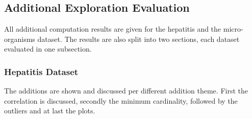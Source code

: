 \documentclass[10pt,a4paper]{report}
\begin{document}
	\subsection{Additional Exploration Evaluation}
	\label{DEsubsec:ResultsAdditionalEvaluation}
	
	All additional computation results are given for the hepatitis and the micro-organisms dataset. The results are also split into two sections, each dataset evaluated in one subsection.
	
	\subsubsection{Hepatitis Dataset}
	\label{DEsubsec:AdditionalResultHepatitis}
	
	The additions are shown and discussed per different addition theme. First the correlation is discussed, secondly the minimum cardinality, followed by the outliers and at last the plots.
	
\end{document}
